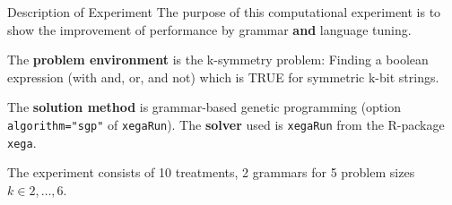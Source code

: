 \begin{frame}
\vspace*{2mm}
\begin{block}{
Description of Experiment
}
The purpose of this computational experiment is to show the improvement
of performance by grammar {\bf and} language tuning.
 
The {\bf problem environment} is the k-symmetry problem: 
Finding a boolean expression (with and, or, and not)
which is TRUE for symmetric k-bit strings.
 
The {\bf solution method} is grammar-based genetic programming
(option {\tt algorithm="sgp"}  of {\tt xegaRun}).
The {\bf solver} used is {\tt xegaRun} from the R-package {\tt xega}.
 
The experiment consists of 10 treatments, 2 grammars for 5 problem sizes $k\in 2,\dots, 6$.
\end{block}
\end{frame}